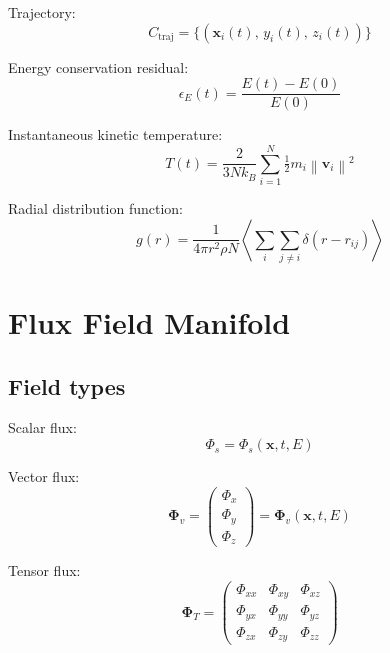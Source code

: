 \documentclass[11pt, a4paper, oneside]{article}
\newcommand{\xvec}{\mathbf{x}}
\newcommand{\vvec}{\mathbf{v}}
\newcommand{\Phivec}{\bm{\Phi}}
\newcommand{\norm}[1]{\left\|#1\right\|}
\begin{document}
Trajectory:
\begin{equation}
  C_{\mathrm{traj}} = \{(\xvec_i(t),\, y_i(t),\, z_i(t))\}
  \label{eq:c_traj}
\end{equation}

Energy conservation residual:
\begin{equation}
  \epsilon_E(t) = \frac{E(t) - E(0)}{E(0)}
  \label{eq:c_edrift}
\end{equation}

Instantaneous kinetic temperature:
\begin{equation}
  T(t) = \frac{2}{3Nk_B}\sum_{i=1}^{N} \tfrac{1}{2}m_i\norm{\vvec_i}^2
  \label{eq:c_temp}
\end{equation}

Radial distribution function:
\begin{equation}
  g(r) = \frac{1}{4\pi r^2 \rho N}
  \left\langle \sum_{i} \sum_{j \neq i} \delta(r - r_{ij}) \right\rangle
  \label{eq:c_rdf}
\end{equation}

\section{Flux Field Manifold}
\label{sec:flux}

\subsection{Field types}

Scalar flux:
\begin{equation}
  \Phi_s = \Phi_s(\xvec, t, E)
  \label{eq:flux_scalar}
\end{equation}

Vector flux:
\begin{equation}
  \Phivec_v = \begin{pmatrix}\Phi_x \\ \Phi_y \\ \Phi_z\end{pmatrix}
  = \Phivec_v(\xvec, t, E)
  \label{eq:flux_vec}
\end{equation}

Tensor flux:
\begin{equation}
  \mathbf{\Phi}_T =
  \begin{pmatrix}
    \Phi_{xx} & \Phi_{xy} & \Phi_{xz} \\
    \Phi_{yx} & \Phi_{yy} & \Phi_{yz} \\
    \Phi_{zx} & \Phi_{zy} & \Phi_{zz}
  \end{pmatrix}
  \label{eq:flux_tensor}
\end{equation}
\end{document}
